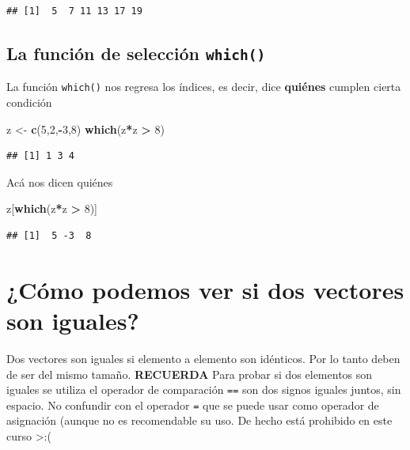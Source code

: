 \documentclass[
]{book}
\newenvironment{Shaded}{\begin{snugshade}}{\end{snugshade}}
\newcommand{\DecValTok}[1]{\textcolor[rgb]{0.00,0.00,0.81}{#1}}
\newcommand{\FunctionTok}[1]{\textcolor[rgb]{0.13,0.29,0.53}{\textbf{#1}}}
\newcommand{\NormalTok}[1]{#1}
\newcommand{\OtherTok}[1]{\textcolor[rgb]{0.56,0.35,0.01}{#1}}
\newcommand{\SpecialCharTok}[1]{\textcolor[rgb]{0.81,0.36,0.00}{\textbf{#1}}}
\begin{document}
\begin{verbatim}
## [1]  5  7 11 13 17 19
\end{verbatim}

\subsection{\texorpdfstring{La función de selección \texttt{which()}}{La función de selección which()}}\label{la-funciuxf3n-de-selecciuxf3n-which}

La función \texttt{which()} nos regresa los índices, es decir, dice \textbf{quiénes} cumplen cierta condición

\begin{Shaded}
\begin{Highlighting}[]
\NormalTok{z }\OtherTok{\textless{}{-}} \FunctionTok{c}\NormalTok{(}\DecValTok{5}\NormalTok{,}\DecValTok{2}\NormalTok{,}\SpecialCharTok{{-}}\DecValTok{3}\NormalTok{,}\DecValTok{8}\NormalTok{)}
\FunctionTok{which}\NormalTok{(z}\SpecialCharTok{*}\NormalTok{z }\SpecialCharTok{\textgreater{}} \DecValTok{8}\NormalTok{)}
\end{Highlighting}
\end{Shaded}

\begin{verbatim}
## [1] 1 3 4
\end{verbatim}

Acá nos dicen quiénes

\begin{Shaded}
\begin{Highlighting}[]
\NormalTok{z[}\FunctionTok{which}\NormalTok{(z}\SpecialCharTok{*}\NormalTok{z }\SpecialCharTok{\textgreater{}} \DecValTok{8}\NormalTok{)]}
\end{Highlighting}
\end{Shaded}

\begin{verbatim}
## [1]  5 -3  8
\end{verbatim}

\section{¿Cómo podemos ver si dos vectores son iguales?}\label{cuxf3mo-podemos-ver-si-dos-vectores-son-iguales}

Dos vectores son iguales si elemento a elemento son idénticos.
Por lo tanto deben de ser del mismo tamaño.
\textbf{RECUERDA} Para probar si dos elementos son iguales se utiliza el operador de comparación \texttt{==} son dos signos iguales juntos, sin espacio.
No confundir con el operador \texttt{=} que se puede usar como operador de asignación (aunque no es recomendable su uso. De hecho está prohibido en este curso \textgreater:(
\end{document}
